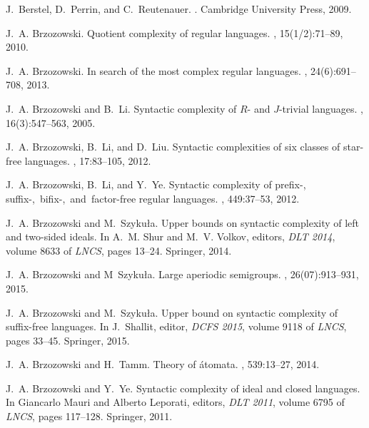 \documentclass{amsart}
\begin{document}

\providecommand{\noopsort}[1]{}
\begin{thebibliography}{10}

J.~Berstel, D.~Perrin, and C.~Reutenauer.
.
\newblock Cambridge University Press, 2009.

J.~A. Brzozowski.
\newblock Quotient complexity of regular languages.
, 15(1/2):71--89, 2010.

J.~A. Brzozowski.
\newblock In search of the most complex regular languages.
, 24(6):691--708, 2013.

J.~A. Brzozowski and B.~Li.
\newblock Syntactic complexity of \mbox{$R$}- and \mbox{$J$}-trivial languages.
, 16(3):547--563, 2005.

J.~A. Brzozowski, B.~Li, and D.~Liu.
\newblock Syntactic complexities of six classes of star-free languages.
, 17:83--105, 2012.

J.~A. Brzozowski, B.~Li, and Y.~Ye.
\newblock Syntactic complexity of \mbox{prefix-,} \mbox{{suffix-,}
  \mbox{bifix-,} and factor-free} regular languages.
, 449:37--53, 2012.

J.~A. Brzozowski and M.~Szyku{\l}a.
\newblock Upper bounds on syntactic complexity of left and two-sided ideals.
\newblock In A.~M. Shur and M.~V. Volkov, editors, {\em DLT 2014}, volume 8633
  of {\em LNCS}, pages 13--24. Springer, 2014.

J.~A. Brzozowski and M~Szyku{\l}a.
\newblock Large aperiodic semigroups.
,
  26(07):913--931, 2015.

J.~A. Brzozowski and M.~Szyku{\l}a.
\newblock Upper bound on syntactic complexity of suffix-free languages.
\newblock In J.~Shallit, editor, {\em DCFS 2015}, volume 9118 of {\em LNCS},
  pages 33--45. Springer, 2015.

J.~A. Brzozowski and H.~Tamm.
\newblock Theory of \'atomata.
, 539:13--27, 2014.

J.~A. Brzozowski and Y.~Ye.
\newblock Syntactic complexity of ideal and closed languages.
\newblock In Giancarlo Mauri and Alberto Leporati, editors, {\em DLT 2011},
  volume 6795 of {\em LNCS}, pages 117--128. Springer, 2011.


\end{thebibliography}
\end{document}

